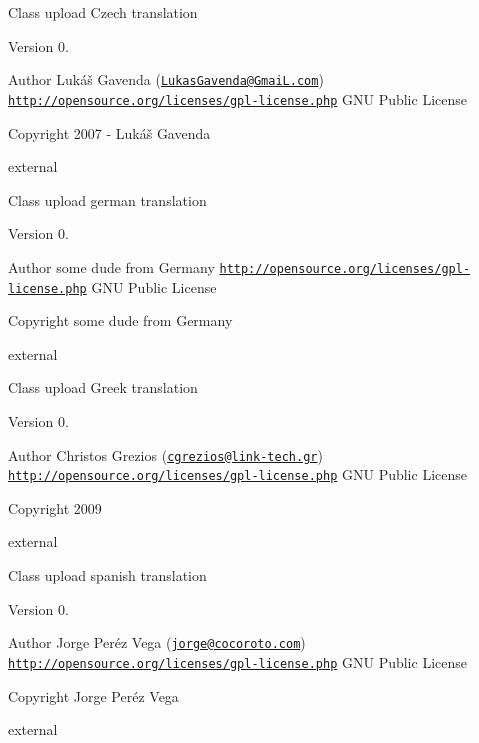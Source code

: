Class upload Czech translation

\begin{DoxyVersion}{Version}
0. 
\end{DoxyVersion}
\begin{DoxyAuthor}{Author}
Lukáš Gavenda (\href{mailto:LukasGavenda@GmaiL.com}{\tt Lukas\+Gavenda@\+Gmai\+L.\+com})  \href{http://opensource.org/licenses/gpl-license.php}{\tt http\+://opensource.\+org/licenses/gpl-\/license.\+php} G\+N\+U Public License 
\end{DoxyAuthor}
\begin{DoxyCopyright}{Copyright}
2007 -\/ Lukáš Gavenda
\end{DoxyCopyright}
external

Class upload german translation

\begin{DoxyVersion}{Version}
0. 
\end{DoxyVersion}
\begin{DoxyAuthor}{Author}
some dude from Germany  \href{http://opensource.org/licenses/gpl-license.php}{\tt http\+://opensource.\+org/licenses/gpl-\/license.\+php} G\+N\+U Public License 
\end{DoxyAuthor}
\begin{DoxyCopyright}{Copyright}
some dude from Germany
\end{DoxyCopyright}
external

Class upload Greek translation

\begin{DoxyVersion}{Version}
0. 
\end{DoxyVersion}
\begin{DoxyAuthor}{Author}
Christos Grezios (\href{mailto:cgrezios@link-tech.gr}{\tt cgrezios@link-\/tech.\+gr})  \href{http://opensource.org/licenses/gpl-license.php}{\tt http\+://opensource.\+org/licenses/gpl-\/license.\+php} G\+N\+U Public License 
\end{DoxyAuthor}
\begin{DoxyCopyright}{Copyright}
2009
\end{DoxyCopyright}
external

Class upload spanish translation

\begin{DoxyVersion}{Version}
0. 
\end{DoxyVersion}
\begin{DoxyAuthor}{Author}
Jorge Peréz Vega (\href{mailto:jorge@cocoroto.com}{\tt jorge@cocoroto.\+com})  \href{http://opensource.org/licenses/gpl-license.php}{\tt http\+://opensource.\+org/licenses/gpl-\/license.\+php} G\+N\+U Public License 
\end{DoxyAuthor}
\begin{DoxyCopyright}{Copyright}
Jorge Peréz Vega
\end{DoxyCopyright}
external

